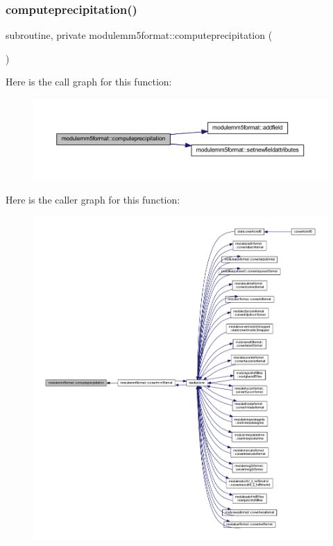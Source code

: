 \subsubsection{\texorpdfstring{computeprecipitation()}{computeprecipitation()}}
{\footnotesize\ttfamily subroutine, private modulemm5format\+::computeprecipitation (\begin{DoxyParamCaption}{ }\end{DoxyParamCaption})\hspace{0.3cm}{\ttfamily [private]}}

Here is the call graph for this function\+:\nopagebreak
\begin{figure}[H]
\begin{center}
\leavevmode
\includegraphics[width=350pt]{namespacemodulemm5format_a86c95504025ac2f03c9c7aa475a35cc4_cgraph}
\end{center}
\end{figure}
Here is the caller graph for this function\+:\nopagebreak
\begin{figure}[H]
\begin{center}
\leavevmode
\includegraphics[width=350pt]{namespacemodulemm5format_a86c95504025ac2f03c9c7aa475a35cc4_icgraph}
\end{center}
\end{figure}
\mbox{\label{namespacemodulemm5format_a3dffbb656aa84f1197105f493790f428}} 
